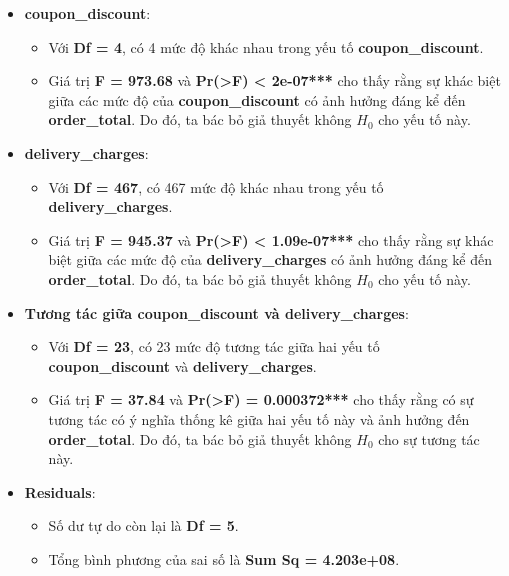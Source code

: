             \begin{itemize}
    \item \textbf{coupon\_discount}:
    \begin{itemize}
        \item Với \textbf{Df = 4}, có 4 mức độ khác nhau trong yếu tố \textbf{coupon\_discount}.
        \item Giá trị \textbf{F = 973.68} và \textbf{Pr(>F) < 2e-07***} cho thấy rằng sự khác biệt giữa các mức độ của \textbf{coupon\_discount} có ảnh hưởng đáng kể đến \textbf{order\_total}. Do đó, ta bác bỏ giả thuyết không \(H_0\) cho yếu tố này.
    \end{itemize}

    \item \textbf{delivery\_charges}:
    \begin{itemize}
        \item Với \textbf{Df = 467}, có 467 mức độ khác nhau trong yếu tố \textbf{delivery\_charges}.
        \item Giá trị \textbf{F = 945.37} và \textbf{Pr(>F) < 1.09e-07***} cho thấy rằng sự khác biệt giữa các mức độ của \textbf{delivery\_charges} có ảnh hưởng đáng kể đến \textbf{order\_total}. Do đó, ta bác bỏ giả thuyết không \(H_0\) cho yếu tố này.
    \end{itemize}

    \item \textbf{Tương tác giữa coupon\_discount và delivery\_charges}:
    \begin{itemize}
        \item Với \textbf{Df = 23}, có 23 mức độ tương tác giữa hai yếu tố \textbf{coupon\_discount} và \textbf{delivery\_charges}.
        \item Giá trị \textbf{F = 37.84} và \textbf{Pr(>F) = 0.000372***} cho thấy rằng có sự tương tác có ý nghĩa thống kê giữa hai yếu tố này và ảnh hưởng đến \textbf{order\_total}. Do đó, ta bác bỏ giả thuyết không \(H_0\) cho sự tương tác này.
    \end{itemize}

    \item \textbf{Residuals}:
    \begin{itemize}
        \item Số dư tự do còn lại là \textbf{Df = 5}.
        \item Tổng bình phương của sai số là \textbf{Sum Sq = 4.203e+08}.
    \end{itemize}
    \end{itemize}

